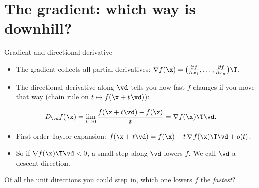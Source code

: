 \section{The gradient: which way is downhill?}

\begin{frame}{Gradient and directional derivative}
  \begin{itemize}\small
    \item The gradient collects all partial derivatives: $\nabla f(\x) = \bigl(\tfrac{\partial f}{\partial x_1},\dots,\tfrac{\partial f}{\partial x_n}\bigr)\T$.
    \item The directional derivative along $\vd$ tells you how fast $f$ changes if you move that way
          (chain rule on $t\mapsto f(\x+t\vd)$):
  \end{itemize}
  \[
    D_{\vd} f(\x) = \lim_{t\to0}\frac{f(\x + t\vd) - f(\x)}{t} = \nabla f(\x)\T\vd .
  \]
  \begin{itemize}\small
    \item First-order Taylor expansion: $f(\x + t\vd) = f(\x) + t\,\nabla f(\x)\T\vd + o(t)$.
    \item So if $\nabla f(\x)\T\vd < 0$, a small step along $\vd$ lowers $f$. We call $\vd$ a \alert{descent direction}.
  \end{itemize}
  \begin{keybox}
    Of all the unit directions you could step in, which one lowers $f$ the \emph{fastest}?
  \end{keybox}
\end{frame}

